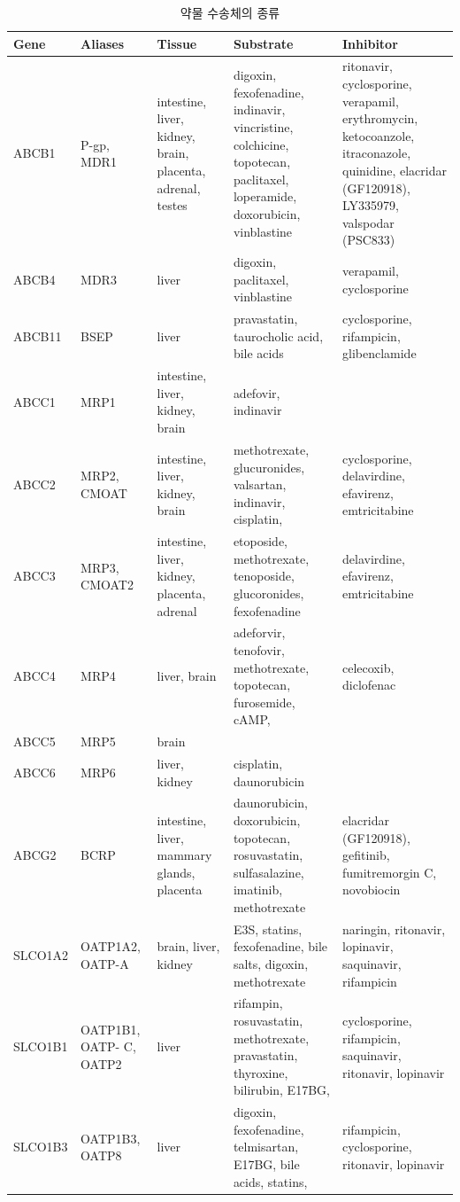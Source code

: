 \documentclass[
  11pt,
  krantz2, a4paper, twoside]{krantz}
\begin{document}
\begin{table}

\caption{\label{tab:transporter}약물 수송체의 종류}
\centering
\begin{tabular}[t]{lllll}
\toprule
Gene & Aliases & Tissue & Substrate & Inhibitor\\
\midrule
ABCB1 & P-gp, MDR1 & intestine, liver, kidney, brain, placenta, adrenal, testes & digoxin, fexofenadine, indinavir, vincristine, colchicine, topotecan, paclitaxel, loperamide, doxorubicin, vinblastine & ritonavir, cyclosporine, verapamil, erythromycin, ketocoanzole, itraconazole, quinidine, elacridar (GF120918), LY335979, valspodar (PSC833)\\
ABCB4 & MDR3 & liver & digoxin, paclitaxel, vinblastine & verapamil, cyclosporine\\
ABCB11 & BSEP & liver & pravastatin, taurocholic acid, bile acids & cyclosporine, rifampicin, glibenclamide\\
ABCC1 & MRP1 & intestine, liver, kidney, brain & adefovir, indinavir & \\
ABCC2 & MRP2, CMOAT & intestine, liver, kidney, brain & methotrexate, glucuronides, valsartan, indinavir, cisplatin, & cyclosporine, delavirdine, efavirenz, emtricitabine\\
\addlinespace
ABCC3 & MRP3, CMOAT2 & intestine, liver, kidney, placenta, adrenal & etoposide, methotrexate, tenoposide, glucoronides, fexofenadine & delavirdine, efavirenz, emtricitabine\\
ABCC4 & MRP4 & liver, brain & adeforvir, tenofovir, methotrexate, topotecan, furosemide, cAMP, & celecoxib, diclofenac\\
ABCC5 & MRP5 & brain &  & \\
ABCC6 & MRP6 & liver, kidney & cisplatin, daunorubicin & \\
ABCG2 & BCRP & intestine, liver, mammary glands, placenta & daunorubicin, doxorubicin, topotecan, rosuvastatin, sulfasalazine, imatinib, methotrexate & elacridar (GF120918), gefitinib, fumitremorgin C, novobiocin\\
\addlinespace
SLCO1A2 & OATP1A2, OATP-A & brain, liver, kidney & E3S, statins, fexofenadine, bile salts, digoxin, methotrexate & naringin, ritonavir, lopinavir, saquinavir, rifampicin\\
SLCO1B1 & OATP1B1, OATP- C, OATP2 & liver & rifampin, rosuvastatin, methotrexate, pravastatin, thyroxine, bilirubin, E17BG, & cyclosporine, rifampicin, saquinavir, ritonavir, lopinavir\\
SLCO1B3 & OATP1B3, OATP8 & liver & digoxin, fexofenadine, telmisartan, E17BG, bile acids, statins, & rifampicin, cyclosporine, ritonavir, lopinavir\\

\end{tabular}
\end{table}
\end{document}
